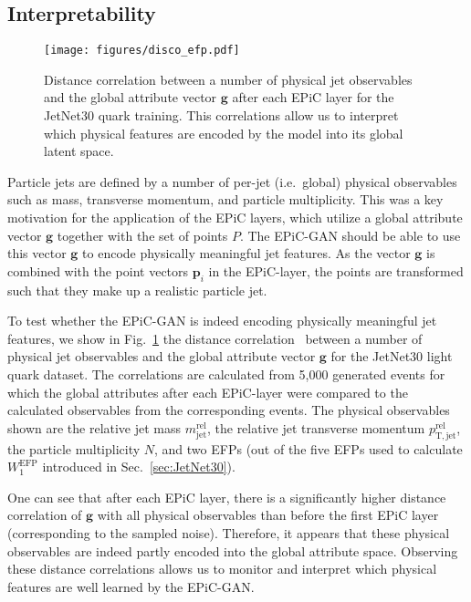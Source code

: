 \documentclass[a4paper,submission, Phys]{SciPost}
\DeclareRobustCommand{\Sec}[1]{Sec.~\ref{sec:#1}}
\DeclareRobustCommand{\Fig}[1]{Fig.~\ref{fig:#1}}
\begin{document}
\subsection{Interpretability}
\label{sec:interpretability}

\begin{figure}[tbp]
\centering
\texttt{[image: figures/disco\_efp.pdf]}
\caption{Distance correlation between a number of physical jet observables and the global attribute vector $\boldsymbol{g}$ after each EPiC layer for the JetNet30 quark training.
%
This correlations allow us to interpret which physical features are encoded by the model into its global latent space.
}
\label{fig:disco_plot}
\end{figure}

Particle jets are defined by a number of per-jet (i.e.~global) physical observables such as mass, transverse momentum, and particle multiplicity. 
%
This was a key motivation for the application of the EPiC layers, which utilize a global attribute vector $\boldsymbol{g}$ together with the set of points $P$.
%
The EPiC-GAN should be able to use this vector $\boldsymbol{g}$ to encode physically meaningful jet features.
%
As the vector $\boldsymbol{g}$ is combined with the point vectors $\boldsymbol{p}_i$ in the EPiC-layer, the points are transformed such that they make up a realistic particle jet.


To test whether the EPiC-GAN is indeed encoding physically meaningful jet features, we show in \Fig{disco_plot} the distance correlation~\cite{distance_correlation} between a number of physical jet observables and the global attribute vector $\boldsymbol{g}$ for the JetNet30 light quark dataset.
%
The correlations are calculated from 5,000 generated events for which the global attributes after each EPiC-layer were compared to the calculated observables from the corresponding events.
%
The physical observables shown are the relative jet mass $m_\mathrm{jet}^
\mathrm{rel}$, the relative jet transverse momentum $p_\mathrm{T,jet}^\mathrm{rel}$, the particle multiplicity $N$, and two EFPs (out of the five EFPs used to calculate $W_1^\mathrm{EFP}$ introduced in \Sec{JetNet30}). 


One can see that after each EPiC layer, there is a significantly higher distance correlation of $\boldsymbol{g}$ with all physical observables than before the first EPiC layer (corresponding to the sampled noise).
%
Therefore, it appears that these physical observables are indeed partly encoded into the global attribute space. 
%
Observing these distance correlations allows us to monitor and interpret which physical features are well learned by the EPiC-GAN. 
\end{document}

